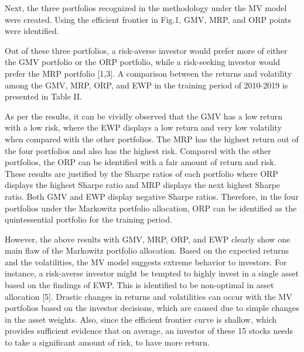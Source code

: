 \documentclass[conference]{IEEEtran}
\begin{document}
Next, the  three portfolios recognized in the methodology under the MV model were created. Using the efficient frontier in Fig.1, GMV, MRP, and ORP points were identified. 

Out of these three portfolios, a risk-averse investor would prefer more of either the GMV portfolio or the ORP portfolio, while a risk-seeking investor would prefer the MRP portfolio [1,3]. A comparison between the returns and volatility among the GMV, MRP, ORP, and EWP in the training period of 2010-2019 is presented in Table II.

\begin{table}[htbp]
\caption{MV Model - Comparison of portfolios in the Training period}\label{tab1}
\end{table}

As per the results, it can be vividly observed that the GMV has a low return with a low risk, where the EWP displays a low return and very low volatility when compared with the other portfolios. The MRP has the highest return out of the four portfolios and also has the highest risk. Compared with the other portfolios, the ORP can be identified with a fair amount of return and risk. These results are justified by the Sharpe ratios of each portfolio where ORP displays the highest Sharpe ratio and MRP displays the next highest Sharpe ratio. Both GMV and EWP display negative Sharpe ratios. Therefore, in the four portfolios under the Markowitz portfolio allocation, ORP can be identified as the quintessential portfolio for the training period. 

However, the above results with GMV, MRP, ORP, and EWP clearly show one main flaw of the Markowitz portfolio allocation. Based on the expected returns and the volatilities, the MV model suggests extreme behavior to investors. For instance, a risk-averse investor might be tempted to highly invest in a single asset based on the findings of EWP. This is identified to be non-optimal in asset allocation [5]. Drastic changes in returns and volatilities can occur with the MV portfolios based on the investor decisions, which are caused due to simple changes in the asset weights. Also, since the efficient frontier curve is shallow, which provides sufficient evidence that on average, an investor of these 15 stocks needs to take a significant amount of risk, to have more return. 
\end{document}
